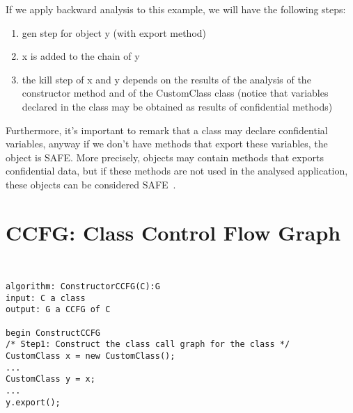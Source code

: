 \documentclass[letterpaper,twocolumn,10pt]{article}
\begin{document}
If we apply backward analysis to this example, we will have the following steps:

\begin{enumerate}
\item gen step for object y (with export method)
\item x is added to the chain of y
\item the kill step of x and y depends on the results of the analysis of the constructor method and of the CustomClass class (notice that variables declared in the class may be obtained as results of confidential methods)
\end{enumerate}

Furthermore, it's important to remark that a class may declare confidential variables, anyway if we don't have methods that export these variables, the object is SAFE. More precisely, objects may contain methods that exports confidential data, but if these methods are not used in the analysed application, these objects can be considered SAFE~\cite{Prefetching}. \\


\section{CCFG: Class Control Flow Graph}
\paragraph{}
{\tt \small
\begin{verbatim}
algorithm: ConstructorCCFG(C):G
input: C a class
output: G a CCFG of C

begin ConstructCCFG
/* Step1: Construct the class call graph for the class */ 
CustomClass x = new CustomClass();
...
CustomClass y = x;
...
y.export();
\end{verbatim}
}

{\footnotesize 

}



\theendnotes


\end{document}
